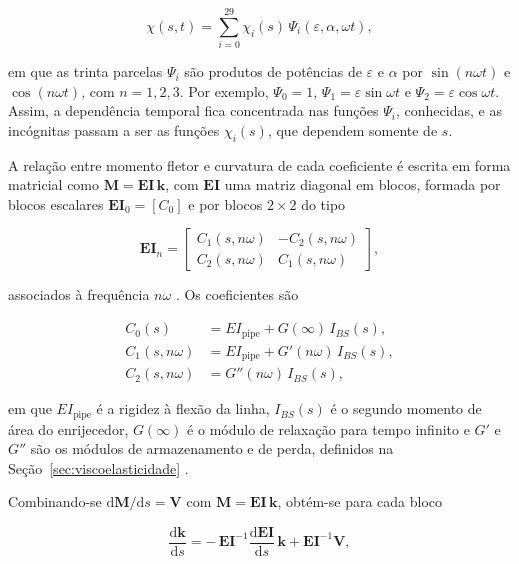 \documentclass[arial,centeredequations,english,brazilian,oneside,section=TITLE]{ifes8}
\begin{document}
\begin{equation}
  \label{eq:base-perturbativa}
  \chi(s,t) = \sum_{i=0}^{29} \chi_i(s)\,\Psi_i(\varepsilon, \alpha, \omega t),
\end{equation}

em que as trinta parcelas $\Psi_i$ são produtos de potências de $\varepsilon$ e $\alpha$
por $\sin(n\omega t)$ e $\cos(n\omega t)$, com $n = 1, 2, 3$. Por exemplo,
$\Psi_0 = 1$, $\Psi_1 = \varepsilon\sin\omega t$ e $\Psi_2 = \varepsilon\cos\omega t$.
Assim, a dependência temporal fica concentrada nas funções $\Psi_i$, conhecidas, e as
incógnitas passam a ser as funções $\chi_i(s)$, que dependem somente de $s$.
 
A relação entre momento fletor e curvatura de cada coeficiente é escrita em forma
matricial como $\mathbf{M} = \mathbf{EI}\,\mathbf{k}$, com $\mathbf{EI}$ uma matriz
diagonal em blocos, formada por blocos escalares $\mathbf{EI}_0 = [C_0]$ e por blocos
$2 \times 2$ do tipo

\begin{equation}
  \label{eq:bloco-EI}
  \mathbf{EI}_n =
  \begin{bmatrix}
    C_1(s, n\omega) & -C_2(s, n\omega) \\
    C_2(s, n\omega) & C_1(s, n\omega)
  \end{bmatrix},
\end{equation}

associados à frequência $n\omega$ \cite{Caire2011}. Os coeficientes são

\begin{align}
  C_0(s) &= EI_{\mathrm{pipe}} + G(\infty)\,I_{BS}(s), \label{eq:C0}\\
  C_1(s, n\omega) &= EI_{\mathrm{pipe}} + G'(n\omega)\,I_{BS}(s), \label{eq:C1}\\
  C_2(s, n\omega) &= G''(n\omega)\,I_{BS}(s), \label{eq:C2}
\end{align}

em que $EI_{\mathrm{pipe}}$ é a rigidez à flexão da linha, $I_{BS}(s)$ é o segundo
momento de área do enrijecedor, $G(\infty)$ é o módulo de relaxação para tempo infinito
e $G'$ e $G''$ são os módulos de armazenamento e de perda, definidos na
Seção~\ref{sec:viscoelasticidade} \cite{Caire2011}.
 
Combinando-se $\mathrm{d}\mathbf{M}/\mathrm{d}s = \mathbf{V}$ com $\mathbf{M} =
\mathbf{EI}\,\mathbf{k}$, obtém-se para cada bloco
\cite{Caire2011}

\begin{equation}
  \label{eq:dk-ds-matricial}
  \frac{\mathrm{d}\mathbf{k}}{\mathrm{d}s}
  = -\,\mathbf{EI}^{-1}\frac{\mathrm{d}\mathbf{EI}}{\mathrm{d}s}\,\mathbf{k}
  + \mathbf{EI}^{-1}\mathbf{V},
\end{equation}
\end{document}
